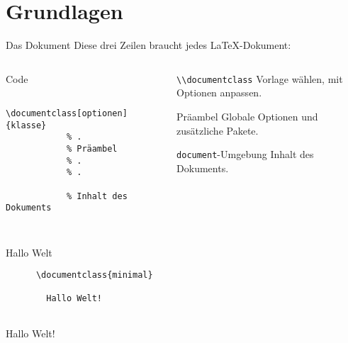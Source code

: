 \section{Grundlagen}

\begin{frame}[fragile]{Das Dokument}
  Diese drei Zeilen braucht jedes \LaTeX-Dokument:
  \begin{columns}[onlytextwidth, t]
    \begin{column}{0.50\textwidth}
      \begin{block}{Code}
        \begin{lstlisting}
          \documentclass[optionen]{klasse}
            % .
            % Präambel
            % .
            % .
          
            % Inhalt des Dokuments
          
        \end{lstlisting}
      \end{block}
    \end{column}
    \begin{column}{0.48\textwidth}
      \begin{block}{\lstinline+\\documentclass+}
        Vorlage wählen, mit Optionen anpassen.
      \end{block}
      \begin{block}{Präambel}
        Globale Optionen und zusätzliche Pakete.
      \end{block}
      \begin{block}{\texttt{document}-Umgebung}
        Inhalt des Dokuments.
      \end{block}
    \end{column}
  \end{columns}
\end{frame}
\begin{frame}[fragile]{Hallo Welt}
  \begin{CodeExample}{0.5}
    \begin{lstlisting}
      \documentclass{minimal}
      
        Hallo Welt!
      
    \end{lstlisting}
  \CodeResult
    \begin{minipage}[c][4\baselineskip][c]{\textwidth}
      \strut
      Hallo Welt!
    \end{minipage}
  \end{CodeExample}
\end{frame}


